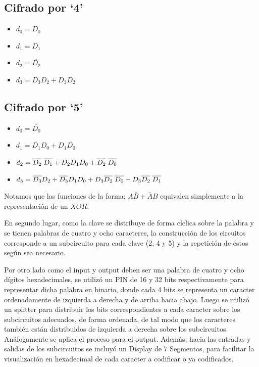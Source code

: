\documentclass[11pt,letterpaper]{article}
\begin{document}
\subsection{Cifrado por `4'}
\begin{itemize}
	\item{$d_0 = D_0$}
	\item{$d_1 = D_1$}
	\item{$d_2 = \overline{D_2}$}
	\item{$d_3 = \overline{D_3}D_2+D_3\overline{D_2}$}
\end{itemize}
\subsection{Cifrado por `5'}
\begin{itemize}
	\item{$d_0 = \overline{D_0}$}
	\item{$d_1 = \overline{D_1}D_0+D_1\overline{D_0}$}
	\item{$d_2 = \overline{D_2}\hspace{0.1cm}\overline{D_1}+D_2D_1D_0+\overline{D_2}\hspace{0.1cm}\overline{D_0}$}
	\item{$d_3 = \overline{D_3}D_2+\overline{D_3}D_1D_0+D_3\overline{D_2}\hspace{0.1cm}\overline{D_0}+D_3\overline{D_2}\hspace{0.1cm}\overline{D_1}$}
\end{itemize}

Notamos que las funciones de la forma: $A\overline{B}+ \overline{A}B$ equivalen simplemente a la representación de un $XOR$.
\vspace{0.2cm}

En segundo lugar, como la clave se distribuye de forma cíclica sobre la palabra y se tienen palabras de cuatro y ocho caracteres, la construcción de los circuitos corresponde a un subcircuito para cada clave (2, 4 y 5) y la repetición de éstos según sea necesario.
\vspace{0.2cm}

Por otro lado como el input y output deben ser una palabra de cuatro y ocho dígitos hexadecimales, se utilizó un PIN de 16 y 32 bits respectivamente para representar dicha palabra en binario, donde cada 4 bits se representa un caracter ordenadamente de izquierda a derecha y de arriba hacia abajo. Luego se utilizó un splitter para distribuir los bits correspondientes a cada caracter sobre los subcircuitos adecuados, de forma ordenada, de tal modo que los caracteres también están distribuidos de izquierda a derecha sobre los subcircuitos. Análogamente se aplica el proceso para el output. Además, hacia las entradas y salidas de los subcircuitos se incluyó un Display de 7 Segmentos, para facilitar la visualización en hexadecimal de cada caracter a codificar o ya codificados.
\end{document}
